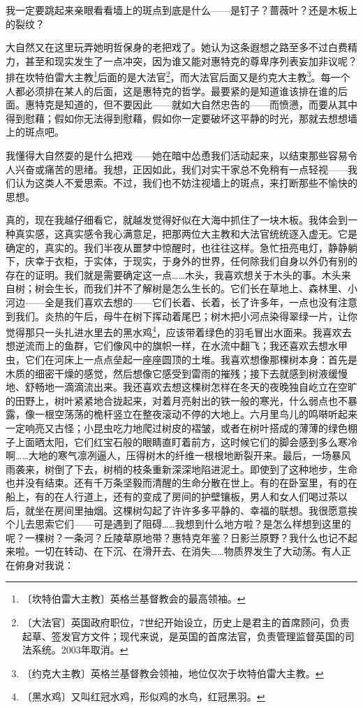 \documentclass[12pt,UTF-8,openany]{ctexbook}
\begin{document}
\begin{normalsize}
    我一定要跳起来亲眼看看墙上的斑点到底是什么——是钉子？蔷薇叶？还是木板上的裂纹？
    
    大自然又在这里玩弄她明哲保身的老把戏了。她认为这条遐想之路至多不过白费精力，甚至和现实发生了一点冲突，因为谁又能对惠特克的尊卑序列表妄加非议呢？排在坎特伯雷大主教\footnote{〔坎特伯雷大主教〕英格兰基督教会的最高领袖。}后面的是大法官\footnote{〔大法官〕英国政府职位，7世纪开始设立，历史上是君主的首席顾问，负责起草、签发官方文件；现代来说，是英国的首席法官，负责管理监督英国的司法系统。2003年取消。}，而大法官后面又是约克大主教\footnote{〔约克大主教〕英格兰基督教会领袖，地位仅次于坎特伯雷大主教。}。每一个人都必须排在某人的后面，这是惠特克的哲学。最要紧的是知道谁该排在谁的后面。惠特克是知道的，但不要因此——就如大自然忠告的——而愤懑，而要从其中得到慰藉；假如你无法得到慰藉，假如你一定要破坏这平静的时光，那就去想想墙上的斑点吧。
    
    我懂得大自然耍的是什么把戏——她在暗中怂恿我们活动起来，以结束那些容易令人兴奋或痛苦的思绪。我想，正因如此，我们对实干家总不免稍有一点轻视——我们认为这类人不爱思索。不过，我们也不妨注视墙上的斑点，来打断那些不愉快的思想。
    
    真的，现在我越仔细看它，就越发觉得好似在大海中抓住了一块木板。我体会到一种真实感，这真实感令我心满意足，把那两位大主教和大法官统统逐入虚无。它是确定的，真实的。我们半夜从噩梦中惊醒时，也往往这样。急忙扭亮电灯，静静躺下，庆幸于衣柜，于实体，于现实，于身外的世界，任何除我们自身以外仍有别的存在的证明。我们就是需要确定这一点……木头，我喜欢想关于木头的事。木头来自树；树会生长，而我们并不了解树是怎么生长的。它们长在草地上、森林里、小河边——全是我们喜欢去想的——它们长着、长着，长了许多年，一点也没有注意到我们。炎热的午后，母牛在树下挥动着尾巴；树木把小河点染得翠绿一片，让你觉得那只一头扎进水里去的黑水鸡\footnote{〔黑水鸡〕又叫红冠水鸡，形似鸡的水鸟，红冠黑羽。}，应该带着绿色的羽毛冒出水面来。我喜欢去想逆流而上的鱼群，它们像风中的旗帜一样，在水流中翻飞；我还喜欢去想水甲虫，它们在河床上一点点垒起一座座圆顶的土堆。我喜欢想像那棵树本身：首先是木质的细密干燥的感觉，然后想像它感受到雷雨的摧残；接下去就感到树液缓慢地、舒畅地一滴滴流出来。我还喜欢去想这棵树怎样在冬天的夜晚独自屹立在空旷的田野上，树叶紧紧地合拢起来，对着月亮射出的铁一般的寒光，什么弱点也不暴露，像一根空荡荡的桅杆竖立在整夜滚动不停的大地上。六月里鸟儿的鸣啭听起来一定响亮又古怪；小昆虫吃力地爬过树皮的褶皱，或者在树叶搭成的薄薄的绿色棚子上面晒太阳，它们红宝石般的眼睛直盯着前方，这时候它们的脚会感到多么寒冷啊……大地的寒气凛冽逼人，压得树木的纤维一根根地断裂开来。最后，一场暴风雨袭来，树倒了下去，树梢的枝条重新深深地陷进泥土。即使到了这种地步，生命也并没有结束。还有千万条坚毅而清醒的生命分散在世上。有的在卧室里，有的在船上，有的在人行道上，还有的变成了房间的护壁镶板，男人和女人们喝过茶以后，就坐在房间里抽烟。这棵树勾起了许许多多平静的、幸福的联想。我很愿意挨个儿去思索它们——可是遇到了阻碍……我想到什么地方啦？是怎么样想到这里的呢？一棵树？一条河？丘陵草原地带？惠特克年鉴？日影兰原野？我什么也记不起来啦。一切在转动、在下沉、在滑开去、在消失……物质界发生了大动荡。有人正在俯身对我说：
    

\end{normalsize}
\end{document}
